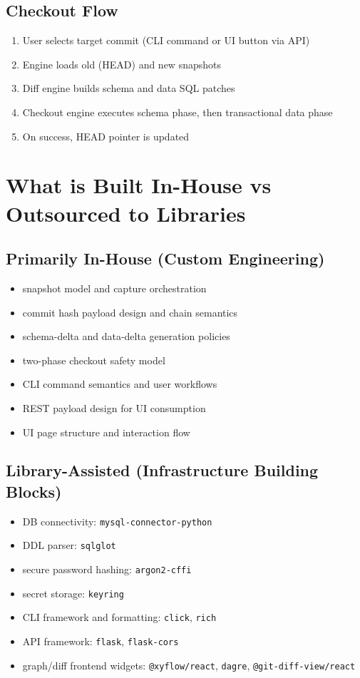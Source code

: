 \documentclass[12pt, a4paper]{article}
\begin{document}
\subsection{Checkout Flow}

\begin{enumerate}[leftmargin=1.5em]
    \item User selects target commit (CLI command or UI button via API)
    \item Engine loads old (HEAD) and new snapshots
    \item Diff engine builds schema and data SQL patches
    \item Checkout engine executes schema phase, then transactional data phase
    \item On success, HEAD pointer is updated
\end{enumerate}

\section{What is Built In-House vs Outsourced to Libraries}

\subsection{Primarily In-House (Custom Engineering)}

\begin{itemize}[leftmargin=1.5em]
    \item snapshot model and capture orchestration
    \item commit hash payload design and chain semantics
    \item schema-delta and data-delta generation policies
    \item two-phase checkout safety model
    \item CLI command semantics and user workflows
    \item REST payload design for UI consumption
    \item UI page structure and interaction flow
\end{itemize}

\subsection{Library-Assisted (Infrastructure Building Blocks)}

\begin{itemize}[leftmargin=1.5em]
    \item DB connectivity: \texttt{mysql-connector-python}
    \item DDL parser: \texttt{sqlglot}
    \item secure password hashing: \texttt{argon2-cffi}
    \item secret storage: \texttt{keyring}
    \item CLI framework and formatting: \texttt{click}, \texttt{rich}
    \item API framework: \texttt{flask}, \texttt{flask-cors}
    \item graph/diff frontend widgets: \texttt{@xyflow/react}, \texttt{dagre}, \texttt{@git-diff-view/react}
\end{itemize}
\end{document}
